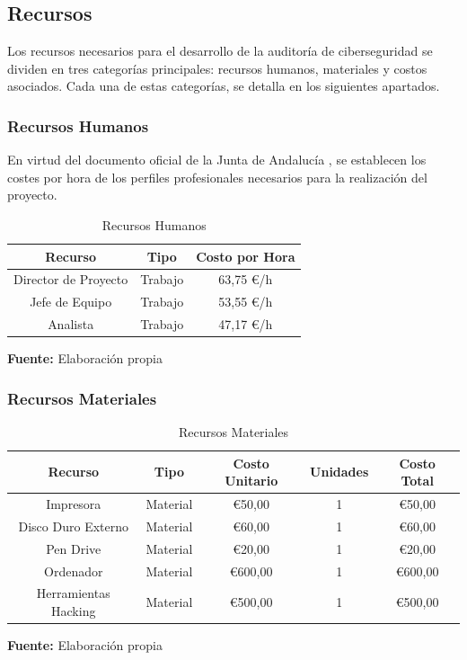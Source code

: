 \documentclass[a4paper, 11pt]{article}
\begin{document}
\subsection{Recursos}

Los recursos necesarios para el desarrollo de la auditoría de ciberseguridad se dividen en tres categorías principales: recursos humanos, materiales y costos asociados. Cada una de estas categorías, se detalla en los siguientes apartados.

\subsubsection{Recursos Humanos}

En virtud del documento oficial de la Junta de Andalucía \cite{junta-perfiles}, se establecen los costes por hora de los perfiles profesionales necesarios para la realización del proyecto.

\begin{table}[H]
\caption{Recursos Humanos}
\centering
\renewcommand{\arraystretch}{1.5}
\begin{tabular}{|c|c|c|}
\hline
\textbf{Recurso} & \textbf{Tipo} & \textbf{Costo por Hora}  \\ \hline
Director de Proyecto & Trabajo & 63,75 €/h  \\ \hline
Jefe de Equipo & Trabajo & 53,55 €/h  \\ \hline
Analista & Trabajo & 47,17 €/h  \\ \hline
\end{tabular}
\begin{flushleft}\centering
    \footnotesize \textbf{Fuente:} Elaboración propia
\end{flushleft}   
\label{tab:recursos_humanos}
\end{table}

\subsubsection{Recursos Materiales}
\begin{table}[H]
\caption{Recursos Materiales}
\centering
\renewcommand{\arraystretch}{1.5}
\begin{tabular}{|c|c|c|c|c|}
\hline
\textbf{Recurso} & \textbf{Tipo} & \textbf{Costo Unitario} & \textbf{Unidades} & \textbf{Costo Total}  \\ \hline
Impresora & Material & €50,00 & 1& €50,00  \\ \hline
Disco Duro Externo & Material &  €60,00 &1& €60,00  \\ \hline
Pen Drive & Material & €20,00 & 1& €20,00  \\ \hline
Ordenador & Material & €600,00 & 1& €600,00  \\ \hline
Herramientas Hacking & Material & €500,00 & 1& €500,00  \\ \hline
\end{tabular}
\begin{flushleft}\centering
    \footnotesize \textbf{Fuente:} Elaboración propia
\end{flushleft}   
\label{tab:recursos_materiales}
\end{table}
\end{document}

